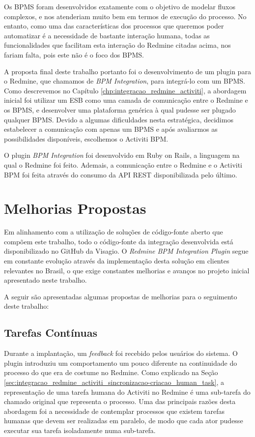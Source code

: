 Os BPMS foram desenvolvidos exatamente com o objetivo de modelar fluxos complexos, e nos atenderiam muito bem em termos de execução do processo. No entanto, como uma das características dos processos que queremos poder automatizar é a necessidade de bastante interação humana, todas as funcionalidades que facilitam esta interação do Redmine citadas acima, nos fariam falta, pois este não é o foco dos BPMS.

A proposta final deste trabalho portanto foi o desenvolvimento de um plugin para o Redmine, que chamamos de \textit{BPM Integration}, para integrá-lo com um BPMS. Como descrevemos no Capítulo \ref{chp:integracao_redmine_activiti}, a abordagem inicial foi utilizar um ESB\cite{esb} como uma camada de comunicação entre o Redmine e os BPMS, e desenvolver uma plataforma genérica à qual pudesse ser plugado qualquer BPMS. Devido a algumas dificuldades nesta estratégica, decidimos estabelecer a comunicação com apenas um BPMS e após avaliarmos as possibilidades disponíveis, escolhemos o Activiti BPM\cite{bpm_activiti}.

O plugin \textit{BPM Integration} foi desenvolvido em Ruby on Rails, a linguagem na qual o Redmine foi feito. Ademais, a comunicação entre o Redmine e o Activiti BPM foi feita através do consumo da API REST disponibilizada pelo último.


\section{Melhorias Propostas}\label{sec:conclusao-melhorias}

Em alinhamento com a utilização de soluções de código-fonte aberto que compõem este trabalho, todo o código-fonte da integração desenvolvida está disponibilizado no GitHub da Visagio\cite{github_visagio}. O \textit{Redmine BPM Integration Plugin} segue em constante evolução através da implementação desta solução em clientes relevantes no Brasil, o que exige constantes melhorias e avanços no projeto inicial apresentado neste trabalho.

A seguir são apresentadas algumas propostas de melhorias para o seguimento deste trabalho:

\subsection{Tarefas Contínuas}

Durante a implantação, um \textit{feedback} foi recebido pelos usuários do sistema. O plugin introduziu um comportamento um pouco diferente na continuidade do processo do que era de costume no Redmine. Como explicado na Seção \ref{sec:integracao_redmine_activiti_sincronizacao-criacao_human_task}, a representação de uma tarefa humana do Activiti no Redmine é uma sub-tarefa do chamado original que representa o processo. Uma das principais razões desta abordagem foi a necessidade de contemplar processos que existem tarefas humanas que devem ser realizadas em paralelo, de modo que cada ator pudesse executar sua tarefa isoladamente numa sub-tarefa. 

